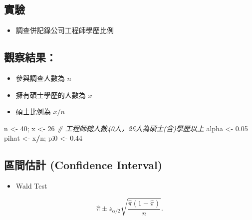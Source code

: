 \documentclass[
]{article}
\newenvironment{Shaded}{\begin{snugshade}}{\end{snugshade}}
\newcommand{\CommentTok}[1]{\textcolor[rgb]{0.56,0.35,0.01}{\textit{#1}}}
\newcommand{\DecValTok}[1]{\textcolor[rgb]{0.00,0.00,0.81}{#1}}
\newcommand{\FloatTok}[1]{\textcolor[rgb]{0.00,0.00,0.81}{#1}}
\newcommand{\NormalTok}[1]{#1}
\newcommand{\OtherTok}[1]{\textcolor[rgb]{0.56,0.35,0.01}{#1}}
\newcommand{\SpecialCharTok}[1]{\textcolor[rgb]{0.81,0.36,0.00}{\textbf{#1}}}
\providecommand{\tightlist}{%
  \setlength{\itemsep}{0pt}\setlength{\parskip}{0pt}}
\begin{document}
\hypertarget{ux5be6ux9a57}{%
\subsection{實驗}\label{ux5be6ux9a57}}

\begin{itemize}
\tightlist
\item
  調查併記錄公司工程師學歷比例
\end{itemize}

\hypertarget{ux89c0ux5bdfux7d50ux679c}{%
\subsection{觀察結果：}\label{ux89c0ux5bdfux7d50ux679c}}

\begin{itemize}
\tightlist
\item
  參與調查人數為 \(n\)
\item
  擁有碩士學歷的人數為 \(x\)
\item
  碩士比例為 \(x/n\)
\end{itemize}

\begin{Shaded}
\begin{Highlighting}[]
\NormalTok{n }\OtherTok{\textless{}{-}} \DecValTok{40}\NormalTok{; x }\OtherTok{\textless{}{-}} \DecValTok{26} \CommentTok{\# 工程師總人數40人，26人為碩士(含)學歷以上}
\NormalTok{alpha }\OtherTok{\textless{}{-}} \FloatTok{0.05}
\NormalTok{pihat }\OtherTok{\textless{}{-}}\NormalTok{ x}\SpecialCharTok{/}\NormalTok{n; pi0 }\OtherTok{\textless{}{-}} \FloatTok{0.44}
\end{Highlighting}
\end{Shaded}

\hypertarget{ux5340ux9593ux4f30ux8a08-confidence-interval}{%
\subsection{區間估計 (Confidence
Interval)}\label{ux5340ux9593ux4f30ux8a08-confidence-interval}}

\begin{itemize}
\tightlist
\item
  Wald Test
\end{itemize}

\[\hat{\pi}\pm
z_{\alpha/2}\sqrt{\frac{\hat{\pi}(1-\hat{\pi})}{n}}.\]
\end{document}
